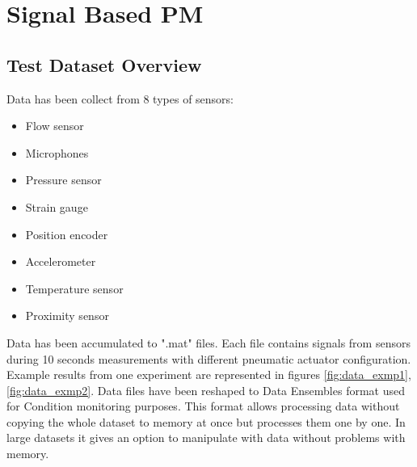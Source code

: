 \documentclass[class=article, crop=false]{standalone}
\begin{document}
\tableofcontents



\section{Signal Based PM}

\subsection{Test Dataset Overview}

Data has been collect from 8 types of sensors:

\begin{itemize}
\item Flow sensor
\item Microphones
\item Pressure sensor
\item Strain gauge
\item Position encoder
\item Accelerometer
\item Temperature sensor
\item Proximity sensor
\end{itemize}

Data has been accumulated to ".mat" files.
Each file contains signals from sensors during 10 seconds measurements with
different pneumatic actuator configuration. Example results from one
experiment are represented in figures \ref{fig:data_exmp1},
\ref{fig:data_exmp2}. Data files have been reshaped
to Data Ensembles format used for Condition monitoring purposes. This
format allows processing data without copying the whole dataset to
memory at once but processes them one by one. In large datasets it gives an
option to manipulate with data without problems with memory.
\end{document}
